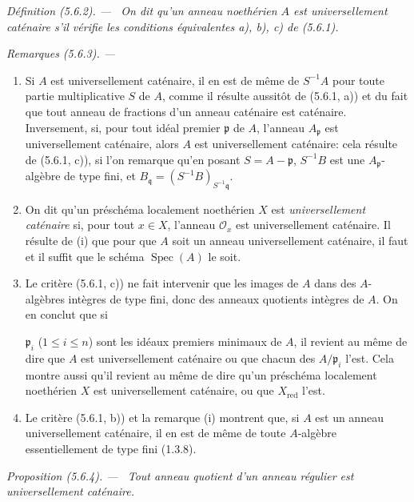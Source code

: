 \documentclass[10pt,oneside]{book}
\newcommand{\oldpage}[2][]{%
  \setcounter{footnote}{0}%
  \marginpar{\scriptsize\textbf{#1}~|~#2}\ignorespaces}
\newenvironment{definition}[1][]{%
  \par\medskip\noindent\itshape Définition (#1). ---\ }{\par}
\newenvironment{proposition}[1][]{%
  \par\medskip\noindent\itshape Proposition (#1). ---\ }{\par}
\newenvironment{remarks}[1][]{%
  \par\medskip\noindent\itshape Remarques (#1). ---\ }{\par}
\begin{document}
\begin{definition}[5.6.2]
\label{IV.2.s5.6.2-fr}
On dit qu'un anneau noethérien $A$ est \emph{universellement caténaire} s'il
vérifie les conditions équivalentes a), b), c) de (5.6.1).
\end{definition}

\begin{remarks}[5.6.3]
\label{IV.2.s5.6.3-fr}
\begin{enumerate}
\item[(i)] Si $A$ est universellement caténaire, il en est de même de
$S^{-1}A$ pour toute partie multiplicative $S$ de $A$, comme il résulte
aussitôt de (5.6.1, a)) et du fait que tout anneau de fractions d'un anneau
caténaire est caténaire. Inversement, si, pour tout idéal premier
$\mathfrak p$ de $A$, l'anneau $A_{\mathfrak p}$ est universellement
caténaire, alors $A$ est universellement caténaire: cela résulte de
(5.6.1, c)), si l'on remarque qu'en posant $S=A-\mathfrak p$, $S^{-1}B$
est une $A_{\mathfrak p}$-algèbre de type fini, et
$B_{\mathfrak q}=(S^{-1}B)_{S^{-1}\mathfrak q}$.
\item[(ii)] On dit qu'un préschéma localement noethérien $X$ est
\emph{universellement caténaire} si, pour tout $x\in X$, l'anneau
$\mathcal O_x$ est universellement caténaire. Il résulte de (i) que pour que
$A$ soit un anneau universellement caténaire, il faut et il suffit que le
schéma $\operatorname{Spec}(A)$ le soit.
\item[(iii)] Le critère (5.6.1, c)) ne fait intervenir que les images de $A$
dans des $A$-algèbres intègres de type fini, donc des anneaux quotients
intègres de $A$. On en conclut que si

\oldpage[IV-2]{99}

$\mathfrak p_i$ ($1\leq i\leq n$) sont les idéaux premiers minimaux de $A$,
il revient au même de dire que $A$ est universellement caténaire ou que
chacun des $A/\mathfrak p_i$ l'est. Cela montre aussi qu'il revient au même
de dire qu'un préschéma localement noethérien $X$ est universellement
caténaire, ou que $X_{\mathrm{red}}$ l'est.
\item[(iv)] Le critère (5.6.1, b)) et la remarque (i) montrent que, si $A$
est un anneau universellement caténaire, il en est de même de toute
$A$-algèbre essentiellement de type fini (1.3.8).
\end{enumerate}
\end{remarks}

\begin{proposition}[5.6.4]
\label{IV.2.s5.6.4-fr}
Tout anneau quotient d'un anneau régulier est universellement caténaire.
\end{proposition}
\end{document}
